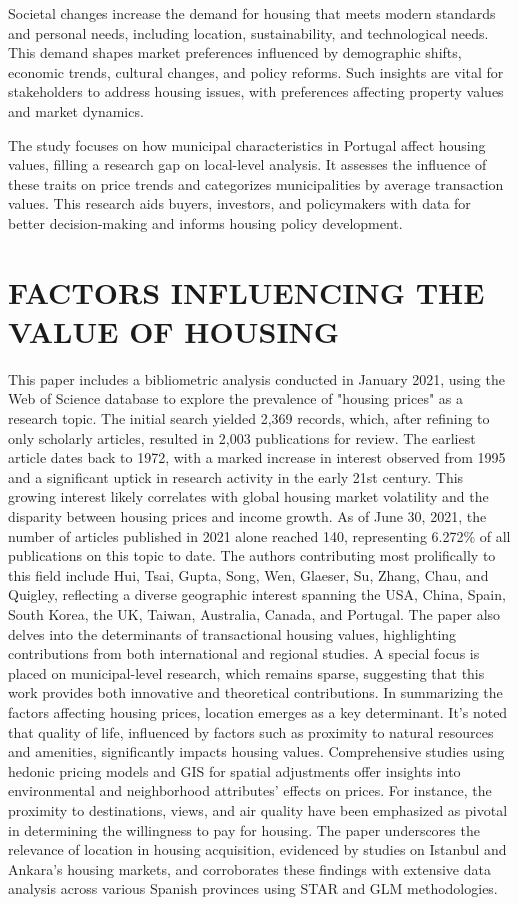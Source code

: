 \documentclass{aip-cp}
\begin{document}
Societal changes increase the demand for housing that meets modern standards and personal needs, including location, sustainability, and technological needs. This demand shapes market preferences influenced by demographic shifts, economic trends, cultural changes, and policy reforms. Such insights are vital for stakeholders to address housing issues, with preferences affecting property values and market dynamics.

The study focuses on how municipal characteristics in Portugal affect housing values, filling a research gap on local-level analysis. It assesses the influence of these traits on price trends and categorizes municipalities by average transaction values. This research aids buyers, investors, and policymakers with data for better decision-making and informs housing policy development.

\section{\uppercase{Factors influencing the value of housing}}

This paper includes a bibliometric analysis conducted in January 2021, using the Web of Science database to explore the prevalence of "housing prices" as a research topic. The initial search yielded 2,369 records, which, after refining to only scholarly articles, resulted in 2,003 publications for review. The earliest article dates back to 1972, with a marked increase in interest observed from 1995 and a significant uptick in research activity in the early 21st century. This growing interest likely correlates with global housing market volatility and the disparity between housing prices and income growth.
As of June 30, 2021, the number of articles published in 2021 alone reached 140, representing 6.272\% of all publications on this topic to date. The authors contributing most prolifically to this field include Hui, Tsai, Gupta, Song, Wen, Glaeser, Su, Zhang, Chau, and Quigley, reflecting a diverse geographic interest spanning the USA, China, Spain, South Korea, the UK, Taiwan, Australia, Canada, and Portugal.
The paper also delves into the determinants of transactional housing values, highlighting contributions from both international and regional studies. A special focus is placed on municipal-level research, which remains sparse, suggesting that this work provides both innovative and theoretical contributions.
In summarizing the factors affecting housing prices, location emerges as a key determinant. It's noted that quality of life, influenced by factors such as proximity to natural resources and amenities, significantly impacts housing values. Comprehensive studies using hedonic pricing models and GIS for spatial adjustments offer insights into environmental and neighborhood attributes' effects on prices. For instance, the proximity to destinations, views, and air quality have been emphasized as pivotal in determining the willingness to pay for housing. The paper underscores the relevance of location in housing acquisition, evidenced by studies on Istanbul and Ankara's housing markets, and corroborates these findings with extensive data analysis across various Spanish provinces using STAR and GLM methodologies.
\end{document}
